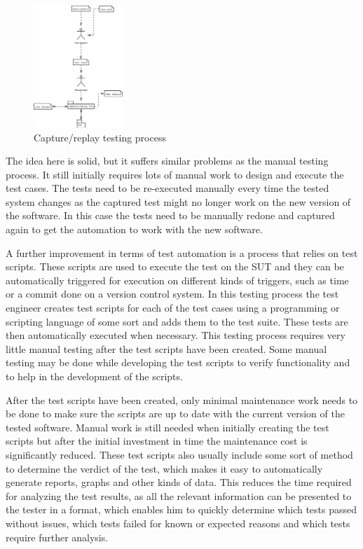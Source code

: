 \begin{figure}[ht]
	\begin{center}
		\includegraphics*[width=0.3\textwidth]{kuvat/CR_process}
	\end{center}
	\caption{Capture/replay testing process}
	\label{fig:crprocess}
\end{figure}

The idea here is solid, but it suffers similar problems as the manual testing process. It still initially requires lots of manual work to design and execute the test cases. The tests need to be re-executed manually every time the tested system changes as the captured test might no longer work on the new version of the software. In this case the tests need to be manually redone and captured again to get the automation to work with the new software.

A further improvement in terms of test automation is a process that relies on test scripts. These scripts are used to execute the test on the SUT and they can be automatically triggered for execution on different kinds of triggers, such as time or a commit done on a version control system. In this testing process the test engineer creates test scripts for each of the test cases using a programming or scripting language of some sort and adds them to the test suite. These tests are then automatically executed when necessary. This testing process requires very little manual testing after the test scripts have been created. Some manual testing may be done while developing the test scripts to verify functionality and to help in the development of the scripts.

After the test scripts have been created, only minimal maintenance work needs to be done to make sure the scripts are up to date with the current version of the tested software. Manual work is still needed when initially creating the test scripts but after the initial investment in time the maintenance cost is significantly reduced. These test scripts also usually include some sort of method to determine the verdict of the test, which makes it easy to automatically generate reports, graphs and other kinds of data. This reduces the time required for analyzing the test results, as all the relevant information can be presented to the tester in a format, which enables him to quickly determine which tests passed without issues, which tests failed for known or expected reasons and which tests require further analysis.

